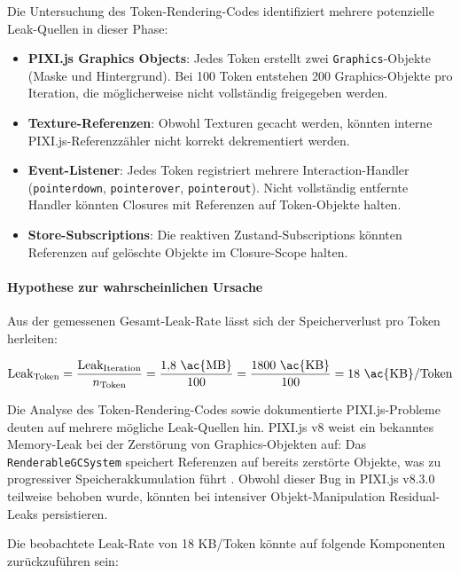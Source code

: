 Die Untersuchung des Token-Rendering-Codes identifiziert mehrere potenzielle Leak-Quellen in dieser Phase:
\begin{itemize}
	\item \textbf{PIXI.js Graphics Objects}: Jedes Token erstellt zwei \texttt{Graphics}-Objekte (Maske und Hintergrund). Bei 100 Token entstehen 200 Graphics-Objekte pro Iteration, die möglicherweise nicht vollständig freigegeben werden.
	\item \textbf{Texture-Referenzen}: Obwohl Texturen gecacht werden, könnten interne PIXI.js-Referenzzähler nicht korrekt dekrementiert werden.
	\item \textbf{Event-Listener}: Jedes Token registriert mehrere Interaction-Handler (\texttt{pointerdown}, \texttt{pointerover}, \texttt{pointerout}). Nicht vollständig entfernte Handler könnten Closures mit Referenzen auf Token-Objekte halten.
	\item \textbf{Store-Subscriptions}: Die reaktiven Zustand-Subscriptions könnten Referenzen auf gelöschte Objekte im Closure-Scope halten.
\end{itemize}

\paragraph{Hypothese zur wahrscheinlichen Ursache}

Aus der gemessenen Gesamt-Leak-Rate lässt sich der Speicherverlust pro Token herleiten:

\begin{equation}
	\text{Leak}_{\text{Token}} = \frac{\text{Leak}_{\text{Iteration}}}{n_{\text{Token}}} = \frac{1{,}8 \text{ \ac{MB}}}{100} = \frac{1800 \text{ \ac{KB}}}{100} = 18 \text{ \ac{KB}/Token}
\end{equation}

Die Analyse des Token-Rendering-Codes sowie dokumentierte PIXI.js-Probleme deuten auf mehrere mögliche Leak-Quellen hin. PIXI.js v8 weist ein bekanntes Memory-Leak bei der Zerstörung von Graphics-Objekten auf: Das \texttt{RenderableGCSystem} speichert Referenzen auf bereits zerstörte Objekte, was zu progressiver Speicherakkumulation führt \autocite{PixiIssue10586}. Obwohl dieser Bug in PIXI.js v8.3.0 teilweise behoben wurde, könnten bei intensiver Objekt-Manipulation Residual-Leaks persistieren.

Die beobachtete Leak-Rate von 18 \ac{KB}/Token könnte auf folgende Komponenten zurückzuführen sein:

